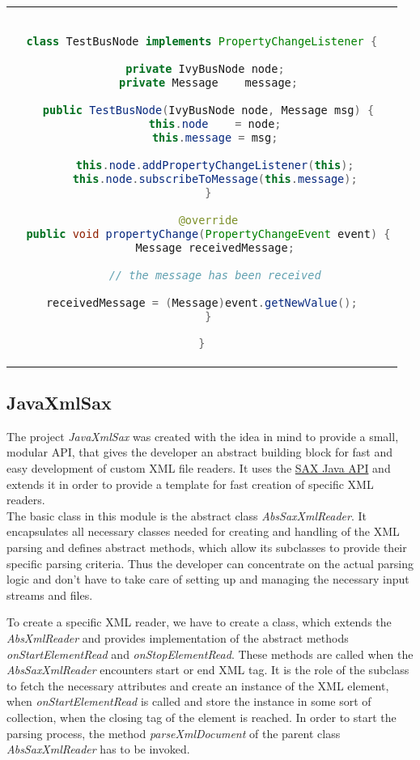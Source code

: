 \begin{center}
\begin{tabular}{c}
\begin{lstlisting}[basicstyle=\small, language=Java, caption={IvyBus subscription}]

class TestBusNode implements PropertyChangeListener {
  
  private IvyBusNode node; 
  private Message    message;
  
  public TestBusNode(IvyBusNode node, Message msg) {
    this.node    = node;
    this.message = msg;
    
    this.node.addPropertyChangeListener(this);
    this.node.subscribeToMessage(this.message);
  }
  
  @override
  public void propertyChange(PropertyChangeEvent event) {
    Message receivedMessage;
    
    // the message has been received
        
    receivedMessage = (Message)event.getNewValue();    
  }

}

\end{lstlisting}
\end{tabular}
\end{center}


\subsection{JavaXmlSax}
\label{sec:xmlImplementation}

The project \textit{JavaXmlSax} was created with the idea in mind to provide a small, modular API, that gives the developer an abstract building block for fast and easy development of custom XML file readers. 
It uses the \href{http://www.saxproject.org/}{SAX Java API} and extends it in order to provide a template for fast creation of specific XML readers.\\

The basic class in this module is the abstract class \textit{AbsSaxXmlReader}. It encapsulates all necessary classes needed for creating and handling of the XML parsing and defines abstract methods, which allow its subclasses to provide their specific parsing criteria. Thus the developer can concentrate on the actual parsing logic and don't have to take care of setting up and managing the necessary input streams and files.

To create a specific XML reader, we have to create a class, which extends the \textit{AbsXmlReader} and provides implementation of the abstract methods \textit{onStartElementRead} and \textit{onStopElementRead}. 
These methods are called when the \textit{AbsSaxXmlReader} encounters start or end XML tag. 
It is the role of the subclass to fetch the necessary attributes and create an instance of the XML element, when \textit{onStartElementRead} is called and store the instance in some sort of collection, when the closing tag of the element is reached.
In order to start the parsing process, the method \textit{parseXmlDocument} of the parent class \textit{AbsSaxXmlReader} has to be invoked. 

